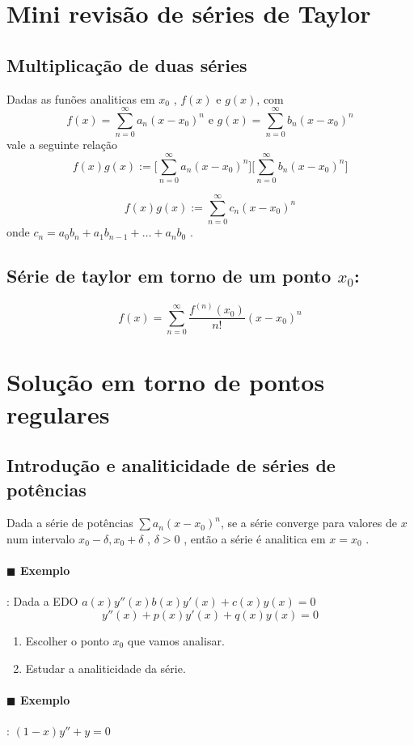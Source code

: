 \section{Mini revisão de séries de Taylor}
\subsection{Multiplicação de duas séries}
  Dadas as funões analiticas em \( x_0 \) , $f(x)$ e $g(x)$, com
  \[ f(x) = \sum_{n = 0}^{\infty} a_n (x - x_0)^n \text{ e } g(x) = \sum_{n = 0}^{\infty}b_n (x - x_0)^n \] 
  vale a seguinte relação
  \[ f(x) g(x) := \bigg[\sum_{n = 0}^{\infty} a_n (x - x_0)^n  \bigg] \bigg[\sum_{n = 0}^{\infty} b_n (x - x_0)^n  \bigg] \]

  \[ f(x) g(x) := \sum_{n = 0}^{\infty} c_n (x-x_0)^n \]
  onde \( c_n = a_0 b_n + a_1 b_{n-1} + \dots + a_n b_0 \) .

\subsection{Série de taylor em torno de um ponto \( x_0 \):}
\[ \boxed{ f(x) =  \sum_{n = 0}^{\infty} \frac{f^{(n)}(x_0)}{n!} (x-x_0)^n } \]
\section{Solução em torno de pontos regulares}
\subsection{Introdução e analiticidade de séries de potências}
 Dada a série de potências $ \sum a_n (x-x_0)^n$, se a série
 converge para valores de \( x \) num intervalo \( x_0 - \delta, x_0 + \delta \) , \( \delta > 0 \) ,
 então a série é analitica em \( x = x_0 \) .
 \paragraph{$\blacksquare$ Exemplo}: Dada a EDO \( a(x) y''(x) b(x)y'(x) + c(x)y(x) = 0 \)
 \[ y''(x) + p(x) y'(x) + q(x) y(x) = 0  \]
 

 \begin{enumerate}
  \item[] Escolher o ponto \( x_0 \) que vamos analisar.
  \item[] Estudar a analiticidade da série.
  \end{enumerate}

\paragraph{$\blacksquare$ Exemplo}:  \( (1 - x) y'' + y = 0  \)


